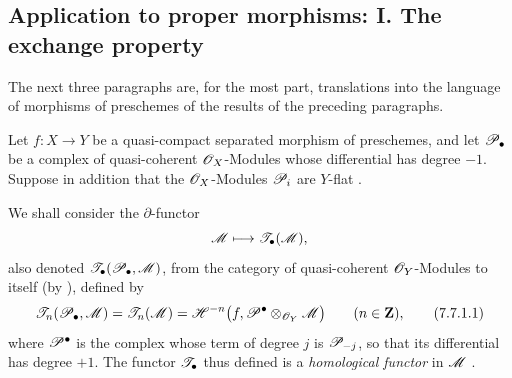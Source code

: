 \subsection{Application to proper morphisms: I. The exchange property}
\label{subsection:III.7.7}
\label{III.7.7}

The next three paragraphs are, for the most part,
translations into the language of morphisms of preschemes
of the results of the preceding paragraphs.

\begin{env}[7.7.1]
\label{III.7.7.1}
Let $f:X\to Y$ be a quasi-compact separated morphism of
preschemes, and let $\mathscr{P}_\bullet$ be a complex of
quasi-coherent $\mathscr{O}_X$-Modules whose differential has
degree $-1$.  Suppose in addition that the $\mathscr{O}_X$-Modules
$\mathscr{P}_i$ are $Y$-flat .

We shall consider the $\partial$-functor
\[
  \mathscr{M}\longmapsto\mathscr{T}_\bullet(\mathscr{M}),
\]
also denoted
$\mathscr{T}_\bullet(\mathscr{P}_\bullet,\mathscr{M})$, from the category of
quasi-coherent $\mathscr{O}_Y$-Modules to itself (by
), defined by
\[
  \sh{T}_n(\sh{P}_\bullet,\sh{M})
  =\sh{T}_n(\sh{M})
  =\mathscr{H}^{-n}
    \bigl(f,\sh{P}^\bullet\otimes_{\sh{O}_Y}\sh{M}\bigr)
  \qquad(n\in\bb Z),
  \tag{7.7.1.1}\label{III.7.7.1.1}
\]
where $\mathscr{P}^\bullet$ is the complex whose term of degree
$j$ is $\mathscr{P}_{-j}$, so that its differential has degree
$+1$.  The functor $\mathscr{T}_\bullet$ thus defined is a
\emph{homological functor} in $\mathscr{M}$ .
\end{env}


